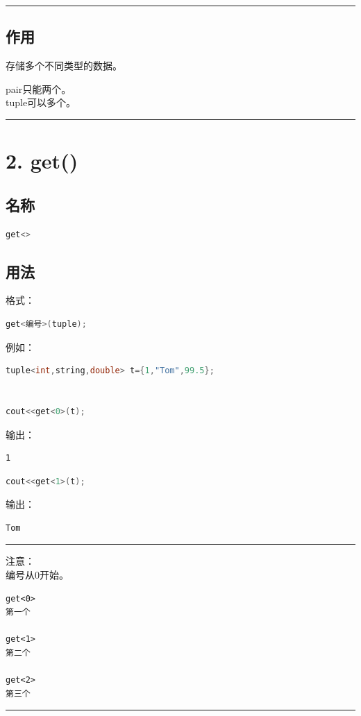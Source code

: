 \documentclass[10pt,twocolumn]{extarticle}
\begin{document}
\noindent\rule{\linewidth}{0.4pt}

\subsection{作用}
存储多个不同类型的数据。

pair只能两个。\\
tuple可以多个。

\noindent\rule{\linewidth}{0.4pt}

\section{2. get()}

\subsection{名称}
\begin{lstlisting}[language=C++]
get<>
\end{lstlisting}

\subsection{用法}
格式：
\begin{lstlisting}[language=C++]
get<编号>(tuple);
\end{lstlisting}
例如：
\begin{lstlisting}[language=C++]
tuple<int,string,double> t={1,"Tom",99.5};


cout<<get<0>(t);
\end{lstlisting}
输出：
\begin{lstlisting}
1
\end{lstlisting}

\begin{lstlisting}[language=C++]
cout<<get<1>(t);
\end{lstlisting}
输出：
\begin{lstlisting}
Tom
\end{lstlisting}

\noindent\rule{\linewidth}{0.4pt}

注意：\\
编号从0开始。
\begin{lstlisting}
get<0>
第一个

get<1>
第二个

get<2>
第三个
\end{lstlisting}

\noindent\rule{\linewidth}{0.4pt}
\end{document}
